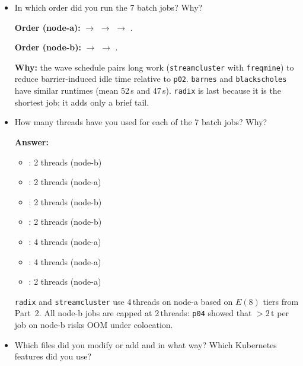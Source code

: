 \begin{enumerate}
\begin{enumerate}
\begin{itemize}
        \item In which order did you run the 7 batch jobs? Why?
    
        \textbf{Order (node-a):}
         $\to$  $\to$  $\to$ .

        \textbf{Order (node-b):}
         $\to$  $\to$ .

\textbf{Why:} the wave schedule pairs long work (\texttt{streamcluster} with
\texttt{freqmine}) to reduce barrier-induced idle time relative to
\texttt{p02}. \texttt{barnes} and \texttt{blackscholes} have similar runtimes (mean 52\,s and 47\,s). \texttt{radix} is last because it is the shortest job; it adds only a brief tail.



        \item How many threads have you used for each of the 7 batch jobs? Why?
    
        \textbf{Answer:}
    
        \begin{itemize}
            \item {}: 2 threads (node-b)
            \item {}: 2 threads (node-a)
            \item {}: 2 threads (node-b)
            \item {}: 2 threads (node-b)
            \item {}: 4 threads (node-a)
            \item {}: 4 threads (node-a)
            \item {}: 2 threads (node-a)
        \end{itemize}

        \texttt{radix} and \texttt{streamcluster} use 4\,threads on node-a based on
        $E(8)$ tiers from Part~2. All node-b jobs are capped at 2\,threads:
        \texttt{p04} showed that $>2$\,t per job on node-b risks OOM under colocation.

        \item Which files did you modify or add and in what way? Which Kubernetes features did you use?
    

\end{itemize}
\end{enumerate}
\end{enumerate}
